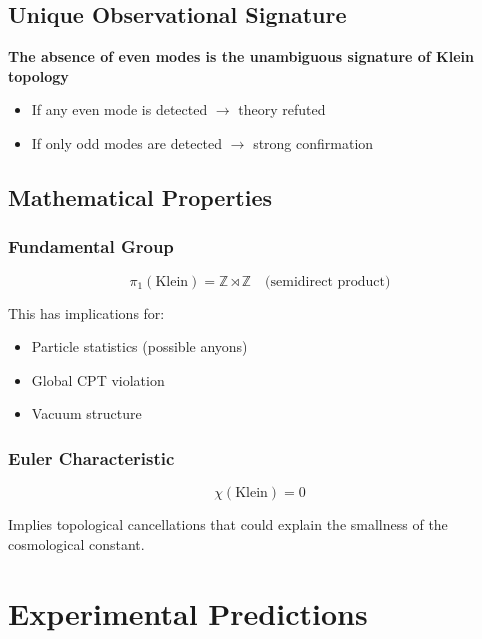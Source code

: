 \documentclass[12pt,a4paper]{article}
\begin{document}
\subsection{Unique Observational Signature}

\textbf{The absence of even modes is the unambiguous signature of Klein topology}

\begin{itemize}
    \item If any even mode is detected $\rightarrow$ theory refuted
    \item If only odd modes are detected $\rightarrow$ strong confirmation
\end{itemize}

\subsection{Mathematical Properties}

\subsubsection{Fundamental Group}

\begin{equation}
\pi_1(\text{Klein}) = \mathbb{Z} \rtimes \mathbb{Z} \quad \text{(semidirect product)}
\end{equation}

This has implications for:
\begin{itemize}
    \item Particle statistics (possible anyons)
    \item Global CPT violation
    \item Vacuum structure
\end{itemize}

\subsubsection{Euler Characteristic}

\begin{equation}
\chi(\text{Klein}) = 0
\end{equation}

Implies topological cancellations that could explain the smallness of the cosmological constant.

\section{Experimental Predictions}
\label{sec:predictions}
\end{document}
